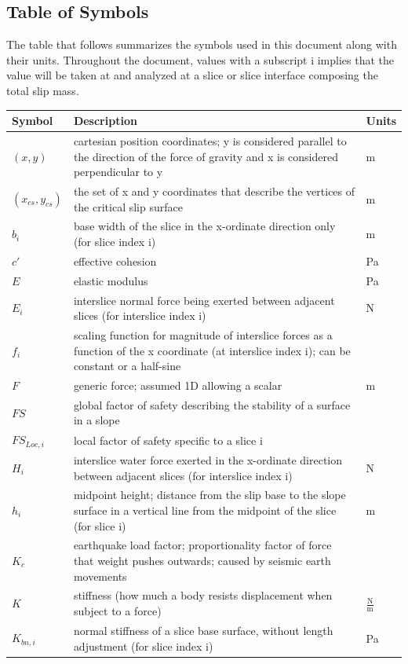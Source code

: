 \documentclass[12pt]{article}
\begin{document}
\subsection{Table of Symbols}
\label{Sec:ToS}
The table that follows summarizes the symbols used in this document along with their units. Throughout the document, values with a subscript i implies that the value will be taken at and analyzed at a slice or slice interface composing the total slip mass.
\begin{longtable*}{l l l}
\toprule
Symbol & Description & Units
\\
\midrule
$(x,y)$ & cartesian position coordinates; y is considered parallel to the direction of the force of gravity and x is considered perpendicular to y & m
\\
$({x_{cs}},{y_{cs}})$ & the set of x and y coordinates that describe the vertices of the critical slip surface & m
\\
$b_{i}$ & base width of the slice in the x-ordinate direction only (for slice index i) & m
\\
$c'$ & effective cohesion & Pa
\\
$E$ & elastic modulus & Pa
\\
$E_{i}$ & interslice normal force being exerted between adjacent slices (for interslice index i) & N
\\
$f_{i}$ & scaling function for magnitude of interslice forces as a function of the x coordinate (at interslice index i); can be constant or a half-sine & 
\\
$F$ & generic force; assumed 1D allowing a scalar & m
\\
$FS$ & global factor of safety describing the stability of a surface in a slope & 
\\
$FS_{Loc,i}$ & local factor of safety specific to a slice i & 
\\
$H_{i}$ & interslice water force exerted in the x-ordinate direction between adjacent slices (for interslice index i) & N
\\
$h_{i}$ & midpoint height; distance from the slip base to the slope surface in a vertical line from the midpoint of the slice (for slice i) & m
\\
$K_{c}$ & earthquake load factor; proportionality factor of force that weight pushes outwards; caused by seismic earth movements & 
\\
$K$ & stiffness (how much a body resists displacement when subject to a force) & $\frac{\text{N}}{\text{m}}$
\\
$K_{bn,i}$ & normal stiffness of a slice base surface, without length adjustment (for slice index i) & Pa

\end{longtable*}
\end{document}
